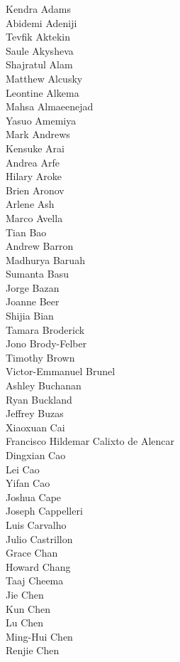 Kendra Adams\\
Abidemi Adeniji\\
Tevfik Aktekin\\
Saule Akysheva\\
Shajratul Alam\\
Matthew Alcusky\\
Leontine Alkema\\
Mahsa Almaeenejad\\
Yasuo Amemiya\\
Mark Andrews\\
Kensuke Arai\\
Andrea Arfe\\
Hilary Aroke\\
Brien Aronov\\
Arlene Ash\\
Marco Avella\\
Tian Bao\\
Andrew Barron\\
Madhurya Baruah\\
Sumanta Basu\\
Jorge Bazan\\
Joanne Beer\\
Shijia Bian\\
Tamara Broderick\\
Jono Brody-Felber\\
Timothy Brown\\
Victor-Emmanuel Brunel\\
Ashley Buchanan\\
Ryan Buckland\\
Jeffrey Buzas\\
Xiaoxuan Cai\\
Francisco Hildemar Calixto de Alencar\\
Dingxian Cao\\
Lei Cao\\
Yifan Cao\\
Joshua Cape\\
Joseph Cappelleri\\
Luis Carvalho\\
Julio Castrillon\\
Grace Chan\\
Howard Chang\\
Taaj Cheema\\
Jie Chen\\
Kun Chen\\
Lu Chen\\
Ming-Hui Chen\\
Renjie Chen\\
